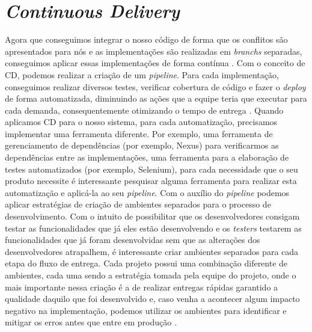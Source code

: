       \section{\textit{Continuous Delivery}}
        Agora que conseguimos integrar o nosso código de forma que os conflitos são
        apresentados para nós e as implementações são realizadas em \textit{branchs}
        separadas, conseguimos aplicar essas implementações de forma contínua
        \cite{TheDevOpsHandbook}. Com o conceito de CD, podemos realizar a criação
        de um \textit{pipeline}. Para cada implementação, conseguimos realizar
        diversos testes, verificar cobertura de código e fazer o \textit{deploy}
        de forma automatizada, diminuindo as ações que a equipe teria que executar
        para cada demanda, consequentemente otimizando o tempo de entrega
        \cite{ContinuousDelivery}. Quando aplicamos CD para o nosso sistema,
        para cada automatização, precisamos implementar uma ferramenta diferente.
        Por exemplo, uma ferramenta de gerenciamento de dependências (por exemplo,
        Nexus) para verificarmos as dependências entre as implementações, uma ferramenta
        para a elaboração de testes automatizados (por exemplo, Selenium), para
        cada necessidade que o seu produto necessite é interessante pesquisar alguma
        ferramenta para realizar esta automatização e aplicá-la ao seu \textit{
        pipeline}. \newline
        Com o auxílio do \textit{pipeline} podemos aplicar estratégias de criação
        de ambientes separados para o processo de desenvolvimento. Com o intuito de
        possibilitar que os desenvolvedores consigam testar as funcionalidades que
        já eles estão desenvolvendo e os \textit{testers} testarem as funcionalidades
        que já foram desenvolvidas sem que as alterações dos desenvolvedores
        atrapalhem, é interessante criar ambientes separados para cada etapa do
        fluxo de entrega. \newline
        Cada projeto possui uma combinação diferente de ambientes, cada uma sendo
        a estratégia tomada pela equipe do projeto, onde o mais importante nessa
        criação é a de realizar entregas rápidas garantido a qualidade daquilo
        que foi desenvolvido e, caso venha a acontecer algum impacto negativo na
        implementação, podemos utilizar os ambientes para identificar e mitigar
        os erros antes que entre em produção \cite{TheDevOpsHandbook}. \newline

